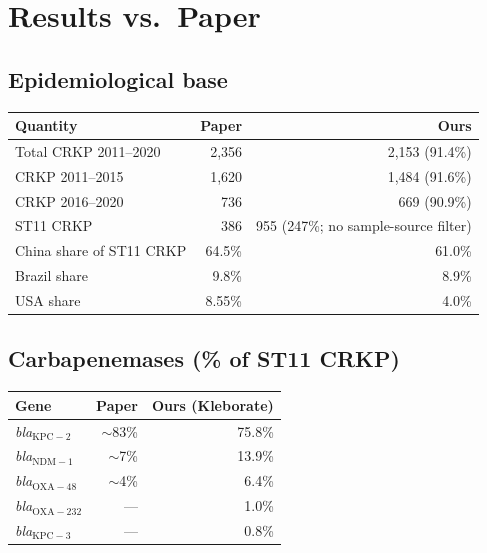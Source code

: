 \documentclass[11pt]{article}
\begin{document}
\section{Results vs.\ Paper}

\subsection{Epidemiological base}
\begin{tabular}{@{}p{7cm}rr@{}}
\toprule
Quantity & Paper & Ours \\
\midrule
Total CRKP 2011--2020                & 2{,}356 & 2{,}153 (91.4\%) \\
CRKP 2011--2015                      & 1{,}620 & 1{,}484 (91.6\%) \\
CRKP 2016--2020                      &    736  &    669 (90.9\%) \\
ST11 CRKP                            &    386  &    955 (247\%; no sample-source filter) \\
China share of ST11 CRKP             & 64.5\%  & 61.0\% \\
Brazil share                         &  9.8\%  &  8.9\% \\
USA share                            &  8.55\% &  4.0\% \\
\bottomrule
\end{tabular}

\subsection{Carbapenemases (\% of ST11 CRKP)}
\begin{tabular}{@{}lrr@{}}
\toprule
Gene & Paper & Ours (Kleborate) \\
\midrule
\emph{bla}$_{\mathrm{KPC-2}}$    & $\sim$83\% & 75.8\% \\
\emph{bla}$_{\mathrm{NDM-1}}$    & $\sim$7\%  & 13.9\% \\
\emph{bla}$_{\mathrm{OXA-48}}$   & $\sim$4\%  & 6.4\%  \\
\emph{bla}$_{\mathrm{OXA-232}}$  & ---        & 1.0\%  \\
\emph{bla}$_{\mathrm{KPC-3}}$    & ---        & 0.8\%  \\
\bottomrule
\end{tabular}
\end{document}
